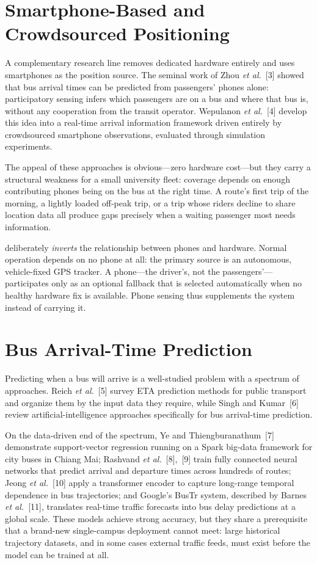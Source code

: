 \section{Smartphone-Based and Crowdsourced Positioning}
\label{sec:lit-phone}
A complementary research line removes dedicated hardware entirely and
uses smartphones as the position source. The seminal work of Zhou
\emph{et al.}~[3] showed that bus arrival times can be predicted from
passengers' phones alone: participatory sensing infers which passengers
are on a bus and where that bus is, without any cooperation from the
transit operator. Wepulanon \emph{et al.}~[4] develop this idea into a
real-time arrival information framework driven entirely by crowdsourced
smartphone observations, evaluated through simulation experiments.

The appeal of these approaches is obvious---zero hardware cost---but they
carry a structural weakness for a small university fleet: coverage depends
on enough contributing phones being on the bus at the right time. A
route's first trip of the morning, a lightly loaded off-peak trip, or a
trip whose riders decline to share location data all produce gaps
precisely when a waiting passenger most needs information.

\system{} deliberately \emph{inverts} the relationship between phones and
hardware. Normal operation depends on no phone at all: the primary source
is an autonomous, vehicle-fixed GPS tracker. A phone---the driver's, not
the passengers'---participates only as an optional fallback that is
selected automatically when no healthy hardware fix is available. Phone
sensing thus supplements the system instead of carrying it.

\section{Bus Arrival-Time Prediction}
\label{sec:lit-eta}
Predicting when a bus will arrive is a well-studied problem with a
spectrum of approaches. Reich \emph{et al.}~[5] survey ETA prediction
methods for public transport and organize them by the input data they
require, while Singh and Kumar~[6] review artificial-intelligence
approaches specifically for bus arrival-time prediction.

On the data-driven end of the spectrum, Ye and Thiengburanathum~[7]
demonstrate support-vector regression running on a Spark big-data
framework for city buses in Chiang Mai; Rashvand \emph{et al.}~[8],~[9]
train fully connected neural networks that predict arrival and departure
times across hundreds of routes; Jeong \emph{et al.}~[10] apply a
transformer encoder to capture long-range temporal dependence in bus
trajectories; and Google's BusTr system, described by Barnes
\emph{et al.}~[11], translates real-time traffic forecasts into bus delay
predictions at a global scale. These models achieve strong accuracy, but
they share a prerequisite that a brand-new single-campus deployment cannot
meet: large historical trajectory datasets, and in some cases external
traffic feeds, must exist before the model can be trained at all.


